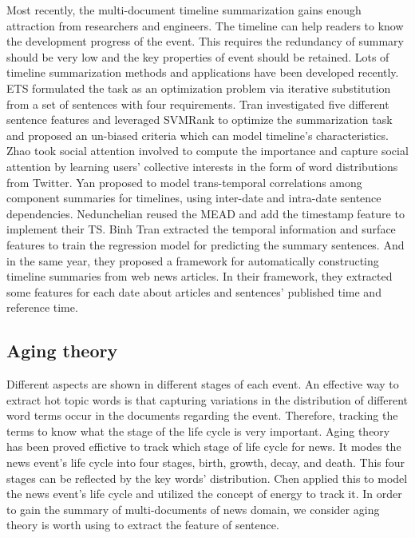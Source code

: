 \documentclass[print]{jicspack}
\begin{document}
Most recently, the multi-document timeline summarization gains enough attraction from researchers and engineers.
The timeline can help readers to know the development  progress of the event.
This requires the redundancy of summary should be very low and the key properties of event should be retained. 
Lots of timeline summarization methods and applications have been developed recently. 
ETS\cite{2011-Yan-p745-754} formulated the task as an optimization  problem via iterative substitution from a set of sentences with four requirements. 
Tran\cite{tran2013leveraging} investigated five different sentence features and leveraged SVMRank to optimize the summarization task and proposed an un-biased criteria which can model timeline's characteristics.
Zhao\cite{zhao2013timeline} took social attention involved to compute the importance and capture social attention by learning users' collective interests in the form of word distributions from Twitter.
Yan\cite{Yan-2011-TGT-2145432-2145483} proposed to model trans-temporal correlations among component summaries for timelines, using inter-date and intra-date sentence dependencies.
Nedunchelian\cite{2008-Nedunchelian-p480-485} reused the MEAD and add the timestamp feature to implement their TS.
Binh Tran\cite{binh2013structured} extracted the temporal information and surface features to train the regression model for predicting the summary sentences. 
And in the same year, they\cite{binh2013predicting} proposed a framework for automatically constructing timeline summaries from web news articles. In their framework, they extracted some features for each date about articles and sentences' published time and reference time.

\subsection{Aging theory}

Different aspects are shown in different stages of each event.
An effective way to extract hot topic words is that capturing variations  in the distribution of different word terms occur in the documents regarding the event.
Therefore, tracking the terms to know what the stage of the life cycle is very important.
Aging theory has been proved effictive to track which stage of life cycle for news. 
It modes the news event's life cycle into four stages, birth, growth, decay, and death.
This four stages can be reflected by the key words' distribution.
Chen\cite{2007-Chen-p1016-1025, chen2003life} applied this to model the news event's life cycle and utilized the concept of energy to track it. 
In order to gain the summary of multi-documents of news domain, we consider aging theory is worth using to extract the feature of sentence.
\end{document}

